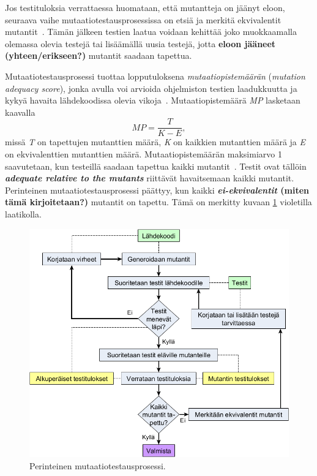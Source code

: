 \documentclass[finnish, grading]{tktltiki2}
\theoremstyle{definition}
\theoremstyle{remark}
\begin{document}
Jos testituloksia verrattaessa huomataan, että mutantteja on jäänyt eloon, seuraava vaihe mutaatiotestausprosessissa on etsiä ja merkitä ekvivalentit mutantit~\cite[s. 36]{Offutt:Untch:2001}. Tämän jälkeen testien laatua voidaan kehittää joko muokkaamalla olemassa olevia testejä tai lisäämällä uusia testejä, jotta \textbf{eloon jääneet (yhteen/erikseen?)} mutantit saadaan tapettua.

Mutaatiotestausprosessi tuottaa lopputuloksena \textit{mutaatiopistemäärän} (\textit{mutation adequacy score}), jonka avulla voi arvioida ohjelmiston testien laadukkuutta ja kykyä havaita lähdekoodissa olevia vikoja~\cite[s. 652]{Jia:Harman:2011}. Mutaatiopistemäärä \textit{MP} lasketaan kaavalla 
\begin{equation}
MP = \frac{T}{K - E},
\end{equation}
missä \textit{T} on tapettujen mutanttien määrä, \textit{K} on kaikkien mutanttien määrä ja \textit{E} on ekvivalenttien mutanttien määrä. Mutaatiopistemäärän maksimiarvo 1 saavutetaan, kun testeillä saadaan tapettua kaikki mutantit~\cite[s. 36]{Offutt:Untch:2001}. Testit ovat tällöin \textit{\textbf{adequate relative to the mutants}} riittävät havaitsemaan kaikki mutantit. Perinteinen mutaatiotestausprosessi päättyy, kun kaikki \textbf{\textit{ei-ekvivalentit} (miten tämä kirjoitetaan?)} mutantit on tapettu. Tämä on merkitty kuvaan \ref{figure:Mutaatiotestausprosessi} violetilla laatikolla.

\begin{figure}[H]
	\centering
		\includegraphics[width=\textwidth]{mutaatiotestausprosessi2}
	\caption{Perinteinen mutaatiotestausprosessi.}
	\label{figure:Mutaatiotestausprosessi}
\end{figure}
\end{document}
